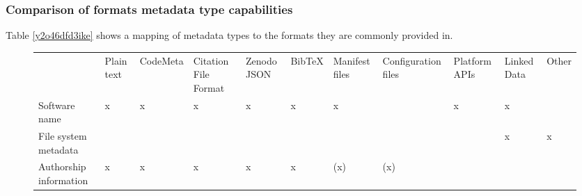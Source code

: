\documentclass{article}
\begin{document}
\subsubsection{Comparison of formats metadata type capabilities}\label{ic5kiajfpf04}
Table \ref{y2o46dfd3ike} shows a mapping of metadata types to the formats they are commonly provided in.

\begin{figure}
\begin{tabular}{lllllllllll}


& Plain text

& CodeMeta

& Citation File Format

& Zenodo JSON

& BibTeX

& Manifest files

& Configuration files

& Platform APIs

& Linked Data

& Other

\\
Software name

& x

& x

& x

& x

& x

& x

& 

& x

& x

& 

\\
File system metadata

& 

& 

& 

& 

& 

& 

& 

& 

& x

& x

\\
Authorship information

& x

& x

& x

& x

& x

& (x)

& (x)


\end{tabular}
\end{figure}
\end{document}
